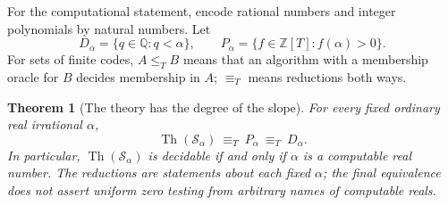 \documentclass[11pt,letterpaper]{article}
\numberwithin{equation}{section}
\newtheorem{theorem}{Theorem}[section]
\theoremstyle{definition}
\theoremstyle{remark}
\newcommand{\Z}{\mathbb Z}
\newcommand{\Q}{\mathbb Q}
\newcommand{\Th}{\operatorname{Th}}
\begin{document}
For the computational statement, encode rational numbers and integer polynomials
by natural numbers. Let
\begin{equation}
 D_\alpha=\{q\in\Q:q<\alpha\},\qquad
 P_\alpha=\{f\in\Z[T]:f(\alpha)>0\}.
\end{equation}
For sets of finite codes, $A\leq_T B$ means that an algorithm with a membership
oracle for $B$ decides membership in $A$; $\equiv_T$ means reductions both ways.

\begin{theorem}[The theory has the degree of the slope]\label{exr:thm:degree}
For every fixed ordinary real irrational $\alpha$,
\begin{equation}\label{exr:eq:degree}
 \Th(\mathcal S_\alpha)\ \equiv_T\ P_\alpha\ \equiv_T\ D_\alpha.
\end{equation}
In particular, $\Th(\mathcal S_\alpha)$ is decidable if and only if $\alpha$ is a
computable real number. The reductions are statements about each fixed $\alpha$;
the final equivalence does not assert uniform zero testing from arbitrary names
of computable reals.
\end{theorem}
\end{document}

